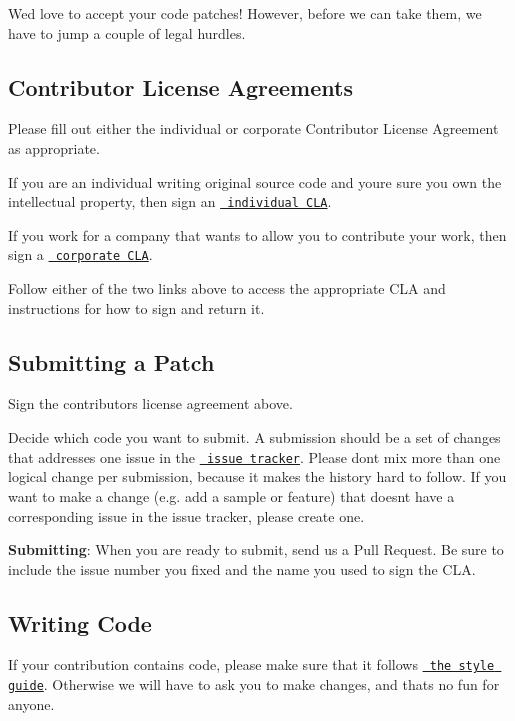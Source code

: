 We\textquotesingle{}d love to accept your code patches! However, before we can take them, we have to jump a couple of legal hurdles.

\subsection*{Contributor License Agreements}

Please fill out either the individual or corporate Contributor License Agreement as appropriate.


\begin{DoxyItemize}
\item If you are an individual writing original source code and you\textquotesingle{}re sure you own the intellectual property, then sign an \href{https://developers.google.com/open-source/cla/individual}{\texttt{ individual C\+LA}}.
\item If you work for a company that wants to allow you to contribute your work, then sign a \href{https://developers.google.com/open-source/cla/corporate}{\texttt{ corporate C\+LA}}.
\end{DoxyItemize}

Follow either of the two links above to access the appropriate C\+LA and instructions for how to sign and return it.

\subsection*{Submitting a Patch}


\begin{DoxyEnumerate}
\item Sign the contributors license agreement above.
\item Decide which code you want to submit. A submission should be a set of changes that addresses one issue in the \href{https://github.com/google/leveldb/issues}{\texttt{ issue tracker}}. Please don\textquotesingle{}t mix more than one logical change per submission, because it makes the history hard to follow. If you want to make a change (e.\+g. add a sample or feature) that doesn\textquotesingle{}t have a corresponding issue in the issue tracker, please create one.
\item {\bfseries{Submitting}}\+: When you are ready to submit, send us a Pull Request. Be sure to include the issue number you fixed and the name you used to sign the C\+LA.
\end{DoxyEnumerate}

\subsection*{Writing Code}

If your contribution contains code, please make sure that it follows \href{http://google-styleguide.googlecode.com/svn/trunk/cppguide.xml}{\texttt{ the style guide}}. Otherwise we will have to ask you to make changes, and that\textquotesingle{}s no fun for anyone. 